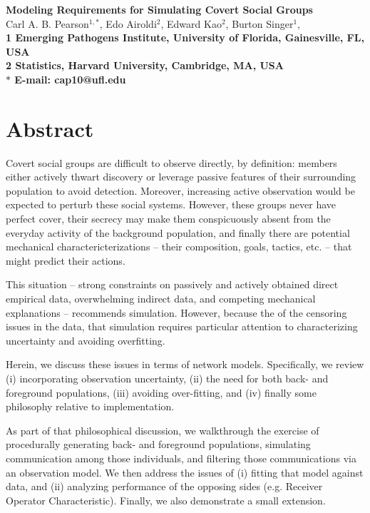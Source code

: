 \documentclass{article}
\begin{document}

\begin{flushleft}
{\Large
\textbf{Modeling Requirements for Simulating Covert Social Groups}
}
\\
Carl A. B. Pearson$^{1,\ast}$, 
Edo Airoldi$^{2}$,
Edward Kao$^{2}$,
Burton Singer$^{1}$, 
\\
\bf{1} Emerging Pathogens Institute, University of Florida, Gainesville, FL, USA
\\
\bf{2} Statistics, Harvard University, Cambridge, MA, USA
\\
$\ast$ E-mail: cap10@ufl.edu
\end{flushleft}
\section*{Abstract}
Covert social groups are difficult to observe directly, by definition: members either actively thwart discovery or leverage passive features of their surrounding population to avoid detection.  Moreover, increasing active observation would be expected to perturb these social systems.  However, these groups never have perfect cover, their secrecy may make them conspicuously absent from the everyday activity of the background population, and finally there are potential mechanical charactericterizations -- their composition, goals, tactics, etc. -- that might predict their actions.

This situation -- strong constraints on passively and actively obtained direct empirical data, overwhelming indirect data, and competing mechanical explanations -- recommends simulation.  However, because the of the censoring issues in the data, that simulation requires particular attention to characterizing uncertainty and avoiding overfitting.

Herein, we discuss these issues in terms of network models.  Specifically, we review (i) incorporating observation uncertainty, (ii) the need for both back- and foreground populations, (iii) avoiding over-fitting, and (iv) finally some philosophy relative to implementation.

As part of that philosophical discussion, we walkthrough the exercise of procedurally generating back- and foreground populations, simulating communication among those individuals, and filtering those communications via an observation model.  We then address the issues of (i) fitting that model against data, and (ii) analyzing performance of the opposing sides (e.g. Receiver Operator Characteristic).  Finally, we also demonstrate a small extension.
\end{document}
